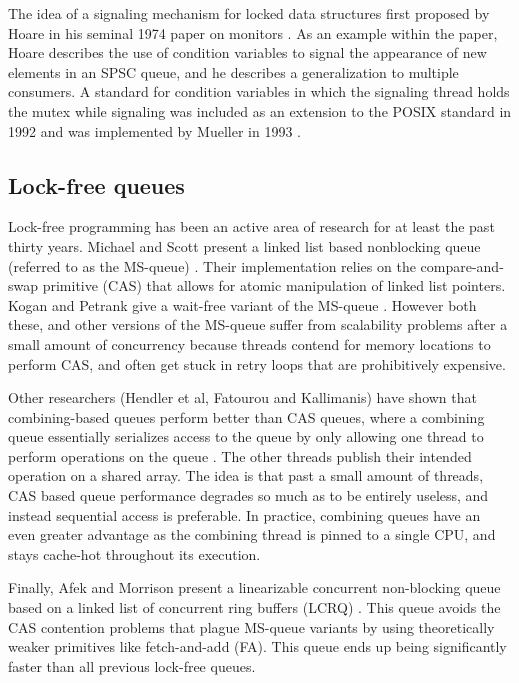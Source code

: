 \documentclass[twoside,10pt]{article}
\begin{document}
\begin{multicols}{2}
The idea of a signaling mechanism for locked data structures first
proposed by Hoare in his seminal 1974 paper on monitors
\cite{hoare1974monitors}. As an example within the paper, Hoare
describes the use of condition variables to signal the appearance of
new elements in an SPSC queue, and he describes a generalization to
multiple consumers. A standard for condition variables in which the
signaling thread holds the mutex while signaling was included as an
extension to the POSIX standard in 1992 and was implemented by Mueller
in 1993 \cite{ieee1992pthreads,mueller1993library}.

\subsection{Lock-free queues}

Lock-free programming has been an active area of research for at least
the past thirty years. Michael and Scott present a linked list based
nonblocking queue (referred to as the MS-queue) \cite{MS96}. Their
implementation relies on the compare-and-swap primitive (CAS) that
allows for atomic manipulation of linked list pointers. Kogan and
Petrank give a wait-free variant of the MS-queue \cite{KP11}. However
both these, and other versions of the MS-queue suffer from scalability
problems after a small amount of concurrency because threads contend
for memory locations to perform CAS, and often get stuck in retry
loops that are prohibitively expensive.

Other researchers (Hendler et al, Fatourou and Kallimanis) have shown
that combining-based queues perform better than CAS queues, where a
combining queue essentially serializes access to the queue by only
allowing one thread to perform operations on the queue \cite{He10,
  FK12}. The other threads publish their intended operation on a
shared array. The idea is that past a small amount of threads, CAS
based queue performance degrades so much as to be entirely useless,
and instead sequential access is preferable. In practice, combining
queues have an even greater advantage as the combining thread is
pinned to a single CPU, and stays cache-hot throughout its execution.

Finally, Afek and Morrison present a linearizable concurrent
non-blocking queue based on a linked list of concurrent ring buffers
(LCRQ) \cite{AM13}. This queue avoids the CAS contention problems that
plague MS-queue variants by using theoretically weaker primitives like
fetch-and-add (FA). This queue ends up being significantly faster than
all previous lock-free queues.


\end{multicols}
\end{document}
